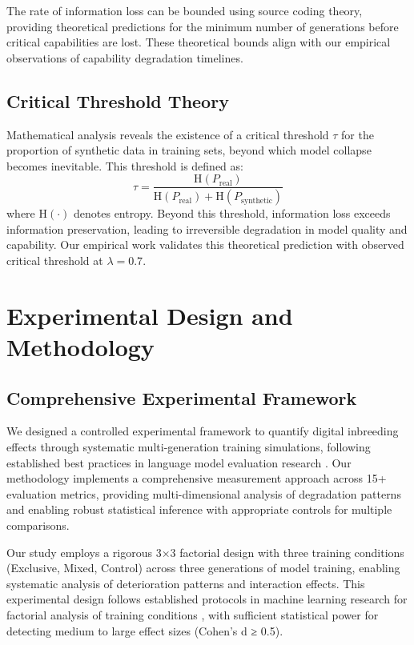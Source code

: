\documentclass{article}
\begin{document}
The rate of information loss can be bounded using source coding theory, providing theoretical predictions for the minimum number of generations before critical capabilities are lost. These theoretical bounds align with our empirical observations of capability degradation timelines.

\subsection{Critical Threshold Theory}

Mathematical analysis reveals the existence of a critical threshold $\tau$ for the proportion of synthetic data in training sets, beyond which model collapse becomes inevitable. This threshold is defined as:
\begin{equation}
\tau = \frac{\text{H}(P_{\text{real}})}{\text{H}(P_{\text{real}}) + \text{H}(P_{\text{synthetic}})}
\end{equation}
where $\text{H}(\cdot)$ denotes entropy. Beyond this threshold, information loss exceeds information preservation, leading to irreversible degradation in model quality and capability. Our empirical work validates this theoretical prediction with observed critical threshold at $\lambda = 0.7$.

\section{Experimental Design and Methodology}

\subsection{Comprehensive Experimental Framework}

We designed a controlled experimental framework to quantify digital inbreeding effects through systematic multi-generation training simulations, following established best practices in language model evaluation research \cite{brown2020language, ouyang2022training}. Our methodology implements a comprehensive measurement approach across 15+ evaluation metrics, providing multi-dimensional analysis of degradation patterns and enabling robust statistical inference with appropriate controls for multiple comparisons.

Our study employs a rigorous 3×3 factorial design with three training conditions (Exclusive, Mixed, Control) across three generations of model training, enabling systematic analysis of deterioration patterns and interaction effects. This experimental design follows established protocols in machine learning research for factorial analysis of training conditions \cite{chowdhery2022palm}, with sufficient statistical power for detecting medium to large effect sizes (Cohen's d ≥ 0.5).
\end{document}
